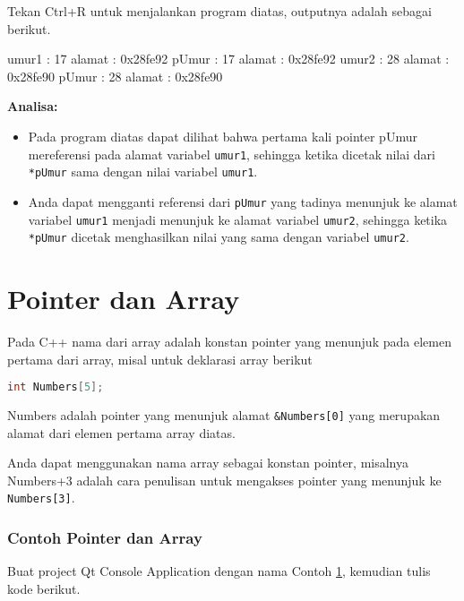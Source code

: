 Tekan Ctrl+R untuk menjalankan program diatas, outputnya adalah sebagai
berikut.

\begin{lcverbatim}
umur1 : 17 alamat : 0x28fe92
pUmur : 17 alamat : 0x28fe92
umur2 : 28 alamat : 0x28fe90
pUmur : 28 alamat : 0x28fe90
\end{lcverbatim}

\textbf{Analisa:}

\begin{itemize}

\item
  Pada program diatas dapat dilihat bahwa pertama kali pointer pUmur
  mereferensi pada alamat variabel \texttt{umur1}, sehingga ketika
  dicetak nilai dari \texttt{*pUmur} sama dengan nilai variabel
  \texttt{umur1}.
\item
  Anda dapat mengganti referensi dari \texttt{pUmur} yang tadinya
  menunjuk ke alamat variabel \texttt{umur1} menjadi menunjuk ke alamat
  variabel \texttt{umur2}, sehingga ketika \texttt{*pUmur} dicetak
  menghasilkan nilai yang sama dengan variabel \texttt{umur2}.
\end{itemize}

\section{Pointer dan Array}\label{pointer-dan-array}

Pada C++ nama dari array adalah konstan pointer yang menunjuk pada
elemen pertama dari array, misal untuk deklarasi array berikut

\begin{lstlisting}[language=c++, numbers=none]
int Numbers[5];
\end{lstlisting}

Numbers adalah pointer yang menunjuk alamat \texttt{\&Numbers{[}0{]}}
yang merupakan alamat dari elemen pertama array diatas.

Anda dapat menggunakan nama array sebagai konstan pointer, misalnya
Numbers+3 adalah cara penulisan untuk mengakses pointer yang menunjuk ke
\texttt{Numbers{[}3{]}}.

\subsubsection*{Contoh  Pointer dan Array}

Buat project Qt Console Application dengan nama Contoh \ref{pointer-dan-array}, kemudian tulis
kode berikut.

